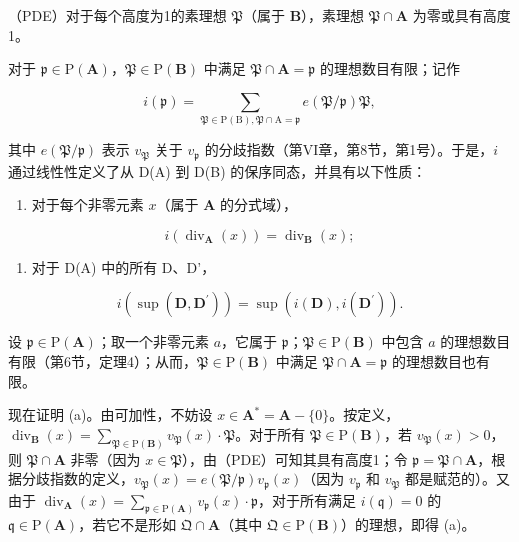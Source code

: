 （PDE）对于每个高度为1的素理想 \(\mathfrak{P}\)（属于 \(\mathbf{B}\)），素理想 \(\mathfrak{P} \cap \mathbf{A}\) 为零或具有高度1。

对于 \(\mathfrak{p} \in \mathrm{P}(\mathbf{A})\)，\(\mathfrak{P} \in \mathrm{P}(\mathbf{B})\) 中满足 \(\mathfrak{P} \cap \mathbf{A} = \mathfrak{p}\) 的理想数目有限；记作

\[
i (\mathfrak {p}) = \sum_ {\mathfrak {P} \in \mathrm{P} (\mathrm{B}), \mathfrak {P} \cap \mathrm{A} = \mathfrak {p}} e (\mathfrak {P} / \mathfrak {p}) \mathfrak {P},
\]

其中 \(e(\mathfrak{P} / \mathfrak{p})\) 表示 \(v_{\mathfrak{P}}\) 关于 \(v_{\mathfrak{p}}\) 的分歧指数（第VI章，第8节，第1号）。于是，\(i\) 通过线性性定义了从 D(A) 到 D(B) 的保序同态，并具有以下性质：

\begin{enumerate}
\def\labelenumi{(\alph{enumi})}
\tightlist
\item
  对于每个非零元素 \(x\)（属于 \(\mathbf{A}\) 的分式域），
\end{enumerate}

\[
i \left(\operatorname{div} _ {\mathbf {A}} (x)\right) = \operatorname{div} _ {\mathbf {B}} (x);
\]

\begin{enumerate}
\def\labelenumi{(\alph{enumi})}
\setcounter{enumi}{1}
\tightlist
\item
  对于 D(A) 中的所有 D、D'，
\end{enumerate}

\[
i \left(\sup (\mathbf {D}, \mathbf {D} ^ {\prime})\right) = \sup (i (\mathbf {D}), i (\mathbf {D} ^ {\prime})).
\]

设 \(\mathfrak{p} \in \mathrm{P}(\mathbf{A})\)；取一个非零元素 \(a\)，它属于 \(\mathfrak{p}\)；\(\mathfrak{P} \in \mathrm{P}(\mathbf{B})\) 中包含 \(a\) 的理想数目有限（第6节，定理4）；从而，\(\mathfrak{P} \in \mathrm{P}(\mathbf{B})\) 中满足 \(\mathfrak{P} \cap \mathbf{A} = \mathfrak{p}\) 的理想数目也有限。

现在证明 (a)。由可加性，不妨设 \(x \in \mathbf{A}^* = \mathbf{A} - \{0\}\)。按定义，\(\operatorname{div}_{\mathbf{B}}(x) = \sum_{\mathfrak{P} \in \mathrm{P}(\mathbf{B})} v_{\mathfrak{P}}(x) \cdot \mathfrak{P}\)。对于所有 \(\mathfrak{P} \in \mathrm{P}(\mathbf{B})\)，若 \(v_{\mathfrak{P}}(x) > 0\)，则 \(\mathfrak{P} \cap \mathbf{A}\) 非零（因为 \(x \in \mathfrak{P}\)），由（PDE）可知其具有高度1；令 \(\mathfrak{p} = \mathfrak{P} \cap \mathbf{A}\)，根据分歧指数的定义，\(v_{\mathfrak{P}}(x) = e(\mathfrak{P}/\mathfrak{p})v_{\mathfrak{p}}(x)\)（因为 \(v_{\mathfrak{p}}\) 和 \(v_{\mathfrak{P}}\) 都是赋范的）。又由于 \(\operatorname{div}_{\mathbf{A}}(x) = \sum_{\mathfrak{p} \in \mathrm{P}(\mathbf{A})} v_{\mathfrak{p}}(x) \cdot \mathfrak{p}\)，对于所有满足 \(i(\mathfrak{q}) = 0\) 的 \(\mathfrak{q} \in \mathrm{P}(\mathbf{A})\)，若它不是形如 \(\mathfrak{Q} \cap \mathbf{A}\)（其中 \(\mathfrak{Q} \in \mathrm{P}(\mathbf{B})\)）的理想，即得 (a)。

